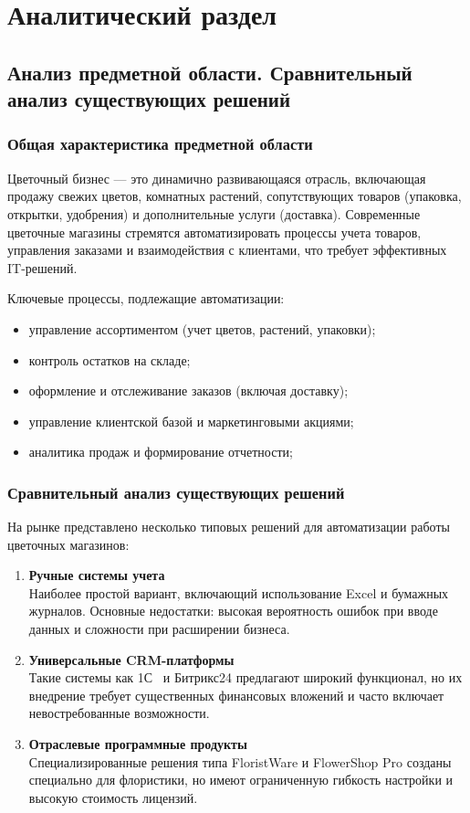 \chapter{Аналитический раздел}
\section{Анализ предметной области. Сравнительный анализ существующих решений}
\subsection*{Общая характеристика предметной области}
Цветочный бизнес — это динамично развивающаяся отрасль, включающая продажу свежих цветов, комнатных растений, сопутствующих товаров (упаковка, открытки, удобрения) и дополнительные услуги (доставка). Современные цветочные магазины стремятся автоматизировать процессы учета товаров, управления заказами и взаимодействия с клиентами, что требует эффективных IT-решений.

Ключевые процессы, подлежащие автоматизации:
\begin{itemize}
	\item управление ассортиментом (учет цветов, растений, упаковки);
	\item контроль остатков на складе;
	\item оформление и отслеживание заказов (включая доставку);
	\item управление клиентской базой и маркетинговыми акциями;
	\item аналитика продаж и формирование отчетности;
\end{itemize}

\subsection*{Сравнительный анализ существующих решений}

На рынке представлено несколько типовых решений для автоматизации работы цветочных магазинов:

\begin{enumerate}
\item \textbf{Ручные системы учета} \\
Наиболее простой вариант, включающий использование Excel и бумажных журналов. Основные недостатки: высокая вероятность ошибок при вводе данных и сложности при расширении бизнеса.

\item \textbf{Универсальные CRM-платформы} \\
Такие системы как 1С~\cite{c1} и Битрикс24 предлагают широкий функционал, но их внедрение требует существенных финансовых вложений и часто включает невостребованные возможности.

\item \textbf{Отраслевые программные продукты} \\
Специализированные решения типа FloristWare и FlowerShop Pro созданы специально для флористики, но имеют ограниченную гибкость настройки и высокую стоимость лицензий.
\end{enumerate}


